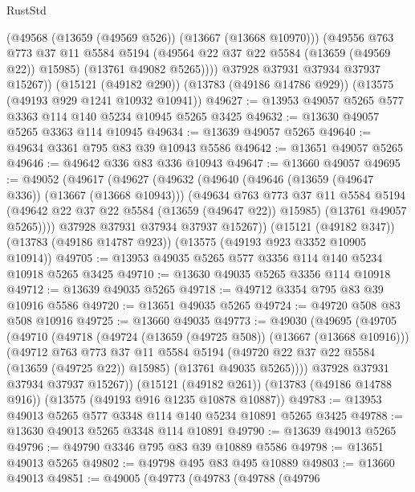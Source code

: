 \begin{lexlean}{RustStd}
\begin{coremodule}
            (@49568 (@13659 (@49569 @526)) (@13667 (@13668 @10970)))
            (@49556
              @763
              @773
              @37
              @11
              @5584
              @5194
              (@49564 @22 @37 @22 @5584 (@13659 (@49569 @22)) @15985)
              (@13761 @49082 @5265))))
        @37928
        @37931
        @37934
        @37937
        @15267))
    (@15121 (@49182 @290))
    (@13783 (@49186 @14786 @929))
    (@13575 (@49193 @929 @1241 @10932 @10941))
@49627 := @13953 @49057 @5265 @577 @3363 @114 @140 @5234 @10945 @5265 @3425
@49632 := @13630 @49057 @5265 @3363 @114 @10945
@49634 := @13639 @49057 @5265
@49640 := @49634 @3361 @795 @83 @39 @10943 @5586
@49642 := @13651 @49057 @5265
@49646 := @49642 @336 @83 @336 @10943
@49647 := @13660 @49057
@49695 := @49052
    (@49617
      (@49627
        (@49632
          (@49640
            (@49646 (@13659 (@49647 @336)) (@13667 (@13668 @10943)))
            (@49634
              @763
              @773
              @37
              @11
              @5584
              @5194
              (@49642 @22 @37 @22 @5584 (@13659 (@49647 @22)) @15985)
              (@13761 @49057 @5265))))
        @37928
        @37931
        @37934
        @37937
        @15267))
    (@15121 (@49182 @347))
    (@13783 (@49186 @14787 @923))
    (@13575 (@49193 @923 @3352 @10905 @10914))
@49705 := @13953 @49035 @5265 @577 @3356 @114 @140 @5234 @10918 @5265 @3425
@49710 := @13630 @49035 @5265 @3356 @114 @10918
@49712 := @13639 @49035 @5265
@49718 := @49712 @3354 @795 @83 @39 @10916 @5586
@49720 := @13651 @49035 @5265
@49724 := @49720 @508 @83 @508 @10916
@49725 := @13660 @49035
@49773 := @49030
    (@49695
      (@49705
        (@49710
          (@49718
            (@49724 (@13659 (@49725 @508)) (@13667 (@13668 @10916)))
            (@49712
              @763
              @773
              @37
              @11
              @5584
              @5194
              (@49720 @22 @37 @22 @5584 (@13659 (@49725 @22)) @15985)
              (@13761 @49035 @5265))))
        @37928
        @37931
        @37934
        @37937
        @15267))
    (@15121 (@49182 @261))
    (@13783 (@49186 @14788 @916))
    (@13575 (@49193 @916 @1235 @10878 @10887))
@49783 := @13953 @49013 @5265 @577 @3348 @114 @140 @5234 @10891 @5265 @3425
@49788 := @13630 @49013 @5265 @3348 @114 @10891
@49790 := @13639 @49013 @5265
@49796 := @49790 @3346 @795 @83 @39 @10889 @5586
@49798 := @13651 @49013 @5265
@49802 := @49798 @495 @83 @495 @10889
@49803 := @13660 @49013
@49851 := @49005
    (@49773
      (@49783
        (@49788
          (@49796

\end{coremodule}
\end{lexlean}
